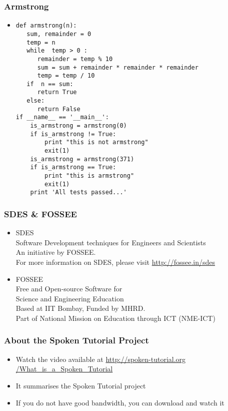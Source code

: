\documentclass[17pt,compress]{beamer}
\begin{document}
\begin{frame}[fragile]
\frametitle{Armstrong}
\label{sec-10}
\begin{itemize}
\item
{\tiny
\begin{lstlisting}
def armstrong(n):
   sum, remainder = 0
   temp = n 
   while  temp > 0 :
      remainder = temp % 10
      sum = sum + remainder * remainder * remainder
      temp = temp / 10 
   if  n == sum:
      return True
   else:
      return False
if __name__ == '__main__':
    is_armstrong = armstrong(0)
    if is_armstrong != True:
        print "this is not armstrong"
        exit(1)
    is_armstrong = armstrong(371)
    if is_armstrong == True:
        print "this is armstrong"
        exit(1)
    print 'All tests passed...'
\end{lstlisting}
}
\end{itemize}
\end{frame}

\begin{frame}
\frametitle{SDES \& FOSSEE}
\begin{center}
\begin{itemize}
\item \small{SDES}\\
\small{\color{LimeGreen}Software Development techniques for 
Engineers and Scientists} \\
\scriptsize An initiative by FOSSEE. \\
\vspace{3pt}
\scriptsize For more information on SDES, please visit 
{\color{blue}\url{http://fossee.in/sdes}}\\
\vspace{12pt}
\item \small{FOSSEE}\\
\small {\color{LimeGreen}Free and Open-source Software for \\
Science and Engineering Education} \\
\scriptsize Based at IIT Bombay, Funded by MHRD.\\
\vspace{3pt}
\scriptsize Part of National Mission on Education through ICT (NME-ICT) \\
\end{itemize}
\end{center}
\end{frame}

\begin{frame}
\frametitle{About the Spoken Tutorial Project}
\begin{itemize}
\item Watch the video available at {\color{blue}\url{http://spoken-tutorial.org
 /What\_is\_a\_Spoken\_Tutorial}} 
\item It summarises the Spoken Tutorial project 
\item If you do not have good bandwidth, you can download and watch it
\end{itemize}
\end{frame}
\end{document}
